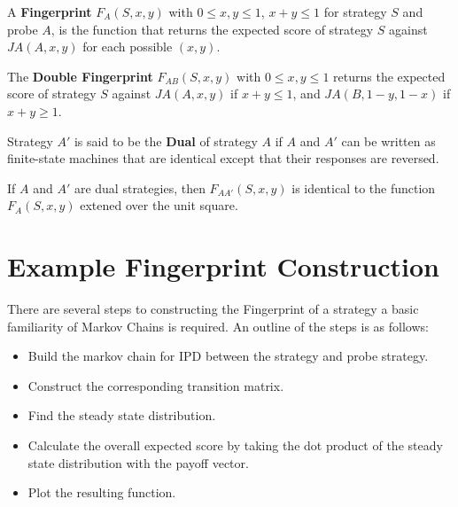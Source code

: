 \begin{definition}\label{def:fingerprint}
A \textbf{Fingerprint} $F_A(S, x, y)$ with $0 \leq x, y \leq 1$, $x+y \leq 1$ for strategy $S$ and probe $A$, is the function that returns the expected score of strategy $S$ against $JA(A, x, y)$ for each possible $(x, y)$.
\end{definition}

\begin{definition}\label{def:double-fingerprint}
The \textbf{Double Fingerprint} $F_{AB}(S, x, y)$ with $0 \leq x, y \leq 1$ returns the expected score of strategy $S$ against $JA(A, x, y)$ if $x+y \leq 1$, and $JA(B, 1-y, 1-x)$ if $x+y \geq 1$.
\end{definition}

\begin{definition}\label{def:dual}
Strategy $A'$ is said to be the \textbf{Dual} of strategy $A$ if $A$ and $A'$ can be written as finite-state machines that are identical except that their responses are reversed.
\end{definition}

\begin{theorem}\label{fingerprint-unit-square}
If $A$ and $A'$ are dual strategies, then $F_{AA'}(S, x, y)$ is identical to the function $F_A(S, x, y)$ extened over the unit square.
\end{theorem}


\section{Example Fingerprint Construction}

There are several steps to constructing the Fingerprint of a strategy a basic familiarity of Markov Chains is required.
An outline of the steps is as follows:

\begin{itemize}
    \item Build the markov chain for IPD between the strategy and probe strategy.
    \item Construct the corresponding transition matrix.
    \item Find the steady state distribution.
    \item Calculate the overall expected score by taking the dot product of the steady state distribution with the payoff vector.
    \item Plot the resulting function. 
\end{itemize}
